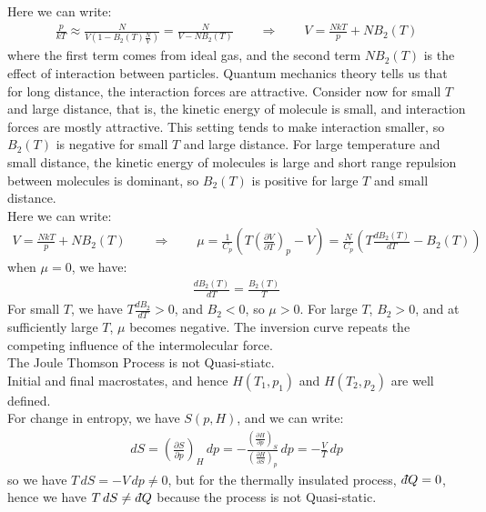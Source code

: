 \documentclass[11pt,oneside]{book}
\theoremstyle{break}
\theoremstyle{break}
\newcommand{\pd}{\partial}
\newcommand{\lr}[1]{\left( #1 \right)}
\newcommand{\dbar}{d\hspace*{-0.08em}\bar{}\hspace*{0.1em}}
\begin{document}
Here we can write:
\begin{align*}
\frac{p}{kT} \approx \frac{N}{V\left(1- B_2(T) \frac{N}{V}\right)} = \frac{N}{V - NB_2(T)} \qquad \Rightarrow \qquad V =\frac{NkT}{p} + NB_2(T)
\end{align*} 
where the first term comes from ideal gas, and the second term $NB_2(T)$ is the effect of interaction between particles. Quantum mechanics theory tells us that for long distance, the interaction forces are attractive. Consider now for small $T$ and large distance, that is, the kinetic energy of molecule is small, and interaction forces are mostly attractive. This setting tends to make interaction smaller, so $B_2(T)$ is negative for small $T$ and large distance. For large temperature and small distance, the kinetic energy of molecules is large and short range repulsion between molecules is dominant, so $B_2(T)$ is positive for large $T$ and small distance. \\

Here we can write:
\begin{align*}
V= \frac{NkT}{p}+NB_2(T) \qquad \Rightarrow \qquad \mu = \frac{1}{C_p}\left( T\lr{\frac{\pd V}{\pd T}}_p - V\right) = \frac{N}{C_p}\lr{T \frac{dB_2(T)}{dT} - B_2(T)}
\end{align*}
when $\mu = 0$, we have:
\begin{align*}
\frac{dB_2(T)}{dT} = \frac{B_2(T)}{T}
\end{align*}
For small $T$, we have $T\frac{dB_2}{dT} >0$, and $B_2<0$, so $\mu>0$. For large $T$, $B_2>0$, and at sufficiently large $T$, $\mu$ becomes negative. The inversion curve repeats the competing influence of the intermolecular force. \\

The Joule Thomson Process is not Quasi-stiatc.\\ 
Initial and final macrostates, and hence $H(T_1, p_1)$ and $H(T_2, p_2)$ are well defined.\\


For change in entropy, we have $S(p,H)$, and we can write:
\begin{align*}
dS = \lr{\frac{\pd S}{\pd p}}_H \, dp = - \frac{\lr{\frac{\pd H}{\pd p}}_S}{\lr{\frac{\pd H}{\pd S}}_p } \, dp = -\frac{V}{T}\, dp
\end{align*}
so we have $T\, dS = -V\, dp \neq 0$, but for the thermally insulated process, $\dbar Q = 0$, hence we have $T\, dS \neq \dbar Q$ because the process is not Quasi-static.\\
\end{document}
